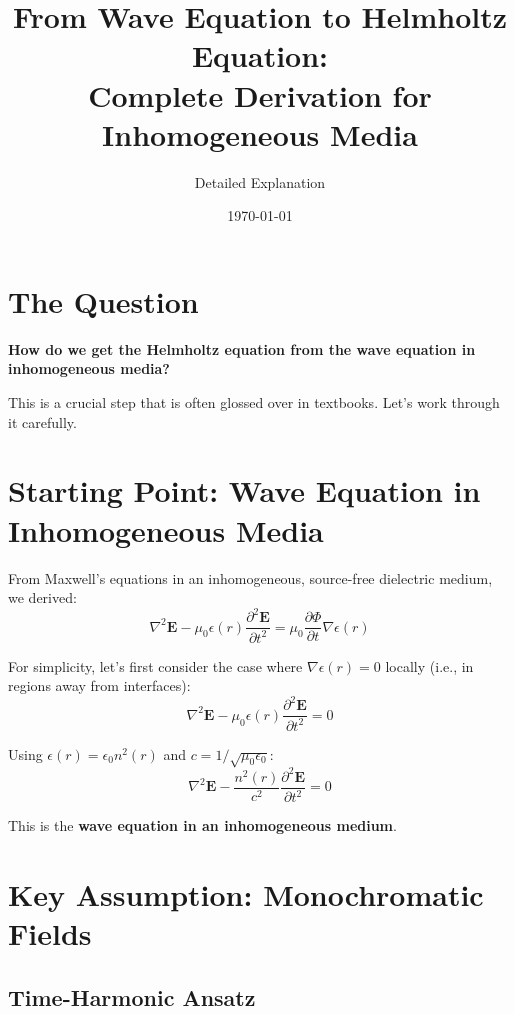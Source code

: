 \documentclass[12pt]{article}
\title{From Wave Equation to Helmholtz Equation: \\
Complete Derivation for Inhomogeneous Media}
\author{Detailed Explanation}
\date{\today}
\begin{document}
\maketitle

\section{The Question}

\textbf{How do we get the Helmholtz equation from the wave equation in inhomogeneous media?}

This is a crucial step that is often glossed over in textbooks. Let's work through it carefully.

\section{Starting Point: Wave Equation in Inhomogeneous Media}

From Maxwell's equations in an inhomogeneous, source-free dielectric medium, we derived:
\begin{equation}
\nabla^2 \mathbf{E} - \mu_0 \epsilon(r) \frac{\partial^2 \mathbf{E}}{\partial t^2} = \mu_0 \frac{\partial \Phi}{\partial t} \nabla \epsilon(r)
\end{equation}

For simplicity, let's first consider the case where $\nabla \epsilon(r) = 0$ locally (i.e., in regions away from interfaces):
\begin{equation}
\nabla^2 \mathbf{E} - \mu_0 \epsilon(r) \frac{\partial^2 \mathbf{E}}{\partial t^2} = 0
\end{equation}

Using $\epsilon(r) = \epsilon_0 n^2(r)$ and $c = 1/\sqrt{\mu_0 \epsilon_0}$:
\begin{equation}
\boxed{\nabla^2 \mathbf{E} - \frac{n^2(r)}{c^2} \frac{\partial^2 \mathbf{E}}{\partial t^2} = 0}
\end{equation}

This is the \textbf{wave equation in an inhomogeneous medium}.

\section{Key Assumption: Monochromatic Fields}

\subsection{Time-Harmonic Ansatz}
\end{document}
